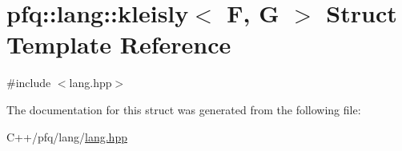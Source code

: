 \hypertarget{structpfq_1_1lang_1_1kleisly}{\section{pfq\+:\+:lang\+:\+:kleisly$<$ F, G $>$ Struct Template Reference}
\label{structpfq_1_1lang_1_1kleisly}
}


{\ttfamily \#include $<$lang.\+hpp$>$}



The documentation for this struct was generated from the following file\+:\begin{DoxyCompactItemize}
\item 
C++/pfq/lang/\hyperlink{lang_8hpp}{lang.\+hpp}\end{DoxyCompactItemize}
